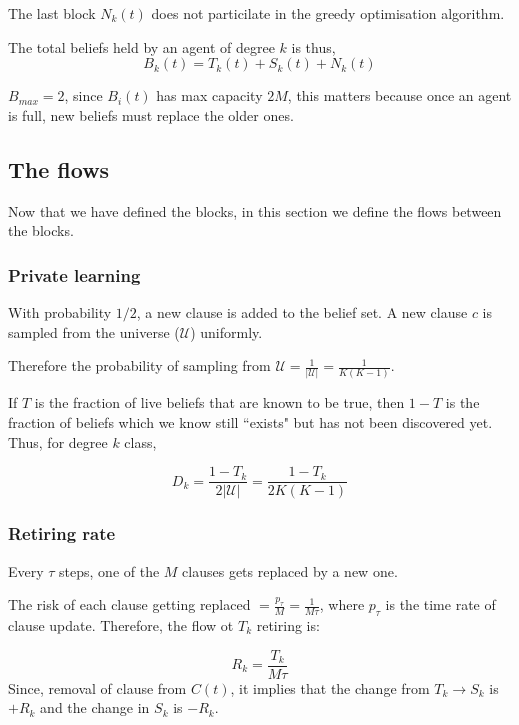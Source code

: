 \documentclass[]{article}
\begin{document}
The last block $N_k(t)$ does not particilate in the greedy optimisation algorithm.

The total beliefs held by an agent of degree $k$ is thus, 
$$
B_k(t)=T_k(t)+S_k(t)+N_k(t)
$$

$B_{max}=2$, since $B_i(t)$ has max capacity $2M$, this matters because once an agent is full, new beliefs must replace the older ones. 

\subsection{The flows}

Now that we have defined the blocks, in this section we define the flows between the blocks. 

\subsubsection{Private learning}

With probability $1/2$, a new clause is added to the belief set. A new clause $c$ is sampled from the universe ($\mathcal{U}$) uniformly.


Therefore the probability of sampling from $\mathcal{U} = \frac{1}{|\mathcal{U}|}=\frac{1}{K(K-1)}$.

If $T$ is the fraction of live beliefs that are known to be true, then $1-T$ is the fraction of beliefs which we know still ``exists" but has not been discovered yet. Thus, for degree $k$ class,

\begin{equation}
	D_k=\frac{1-T_k}{2|\mathcal{U}|}=\frac{1-T_k}{2K(K-1)}
	\label{eq:D_k}
\end{equation}

\subsubsection{Retiring rate}

Every $\tau$ steps, one of the $M$ clauses gets replaced by a new one. 

The risk of each clause getting replaced $= \frac{p_\tau}{M}=\frac{1}{M\tau}$, where $p_\tau$ is the time rate of clause update. Therefore, the flow ot $T_k$ retiring is:

\begin{equation}
	R_k=\frac{T_k}{M\tau}
\end{equation}
Since, removal of clause from $C(t)$, it implies that the change from $T_k\rightarrow S_k$ is $+R_k$ and the change in $S_k$ is $-R_k$.
\end{document}
